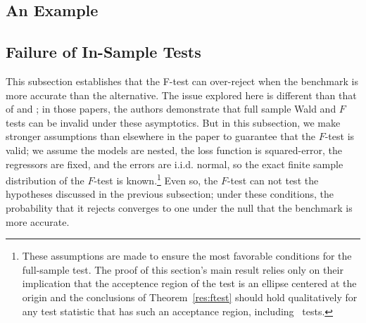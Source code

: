 \documentclass[11pt]{article}
\begin{document}
\subsection{An Example}\label{sec:example}


\subsection{Failure of In-Sample Tests}\label{sec:insample}
This subsection establishes that the F-test can over-reject when the
benchmark is more accurate than the alternative.  The issue explored
here is different than that of \citet{Ana:12} and \citet{Cal:11c}; in
those papers, the authors demonstrate that full sample Wald and $F$
tests can be invalid under these asymptotics.  But in this subsection,
we make stronger assumptions than elsewhere in the paper to guarantee
that the $F$-test is valid; we assume the models are nested, the loss
function is squared-error, the regressors are fixed, and the errors
are i.i.d. normal, so the exact finite sample distribution of the
$F$-test is known.\footnote{These assumptions are made to ensure the
  most favorable conditions for the full-sample test.  The proof of
  this section's main result relies only on their implication that the
  acceptence region of the test is an ellipse centered at the origin
  and the conclusions of Theorem~\ref{res:ftest} should hold
  qualitatively for any test statistic that has such an acceptance
  region, including \oos\ tests.} Even so, the $F$-test can not test
the hypotheses discussed in the previous subsection; under these
conditions, the probability that it rejects converges to one under the
null that the benchmark is more accurate.
\end{document}
